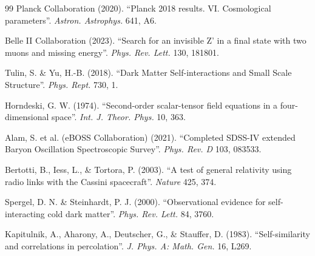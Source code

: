 \documentclass[a4paper,12pt]{article}
\begin{document}
\begin{thebibliography}{99}
 Planck Collaboration (2020). ``Planck 2018 results. VI. Cosmological parameters''. \textit{Astron. Astrophys.} 641, A6.

 Belle II Collaboration (2023). ``Search for an invisible Z' in a final state with two muons and missing energy''. \textit{Phys. Rev. Lett.} 130, 181801.

 Tulin, S. \& Yu, H.-B. (2018). ``Dark Matter Self-interactions and Small Scale Structure''. \textit{Phys. Rept.} 730, 1.

 Horndeski, G. W. (1974). ``Second-order scalar-tensor field equations in a four-dimensional space''. \textit{Int. J. Theor. Phys.} 10, 363.

 Alam, S. et al. (eBOSS Collaboration) (2021). ``Completed SDSS-IV extended Baryon Oscillation Spectroscopic Survey''. \textit{Phys. Rev. D} 103, 083533.


 Bertotti, B., Iess, L., \& Tortora, P. (2003). ``A test of general relativity using radio links with the Cassini spacecraft''. \textit{Nature} 425, 374.

 Spergel, D. N. \& Steinhardt, P. J. (2000). ``Observational evidence for self-interacting cold dark matter''. \textit{Phys. Rev. Lett.} 84, 3760.

 Kapitulnik, A., Aharony, A., Deutscher, G., \& Stauffer, D. (1983). ``Self-similarity and correlations in percolation''. \textit{J. Phys. A: Math. Gen.} 16, L269.
\end{thebibliography}
\end{document}
